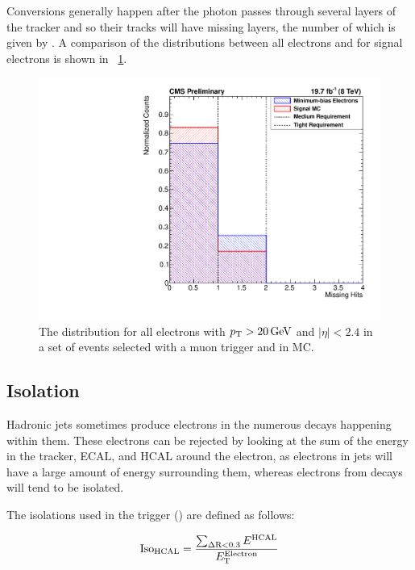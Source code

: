 Conversions generally happen after the photon passes through several layers of
the tracker and so their tracks will have missing layers, the number of which
is given by \nmiss. A comparison of the \nmiss distributions between all
electrons and for signal electrons is shown in \FIG~\ref{fig:nmiss}.

\begin{figure}[!htbp]
    \centering
    \includegraphics[width=\StackedPlotWidth]{figures/e_reco_var_nmiss.pdf}
    \caption[
        Distributions of \nmiss in data and MC.
    ]{
        The \nmiss distribution for all electrons with $p_{\mathrm{T}} > 20 \,\text{Ge\hspace{-.08em}V}$ and
        $|\eta| < 2.4$ in a set of events selected with a muon trigger and in
        \MADGRAPH \Ztoee MC.
    }
    \label{fig:nmiss}
\end{figure}

\subsection{Isolation}
\label{ssec:iso}

Hadronic jets sometimes produce electrons in the numerous decays happening
within them. These electrons can be rejected by looking at the sum of the
energy in the tracker, ECAL, and HCAL around the electron, as electrons in jets
will have a large amount of energy surrounding them, whereas electrons from \Z
decays will tend to be isolated.

The isolations used in the trigger (\SingleElectronTrigger) are defined as
follows:

\begin{equation}
    \text{Iso}_{\text{HCAL}} = \frac{\sum_{\Delta \text{R}<0.3} E^{\text{HCAL}}}{E_{\mathrm{T}}^{\text{Electron}}}
\end{equation}


